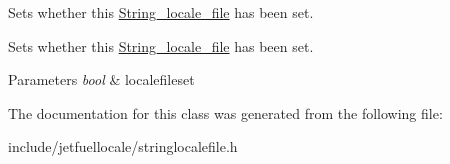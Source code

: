 Sets whether this \hyperlink{classjetfuel_1_1locale_1_1String__locale__file}{String\+\_\+locale\+\_\+file} has been set. 

Sets whether this \hyperlink{classjetfuel_1_1locale_1_1String__locale__file}{String\+\_\+locale\+\_\+file} has been set.


\begin{DoxyParams}{Parameters}
{\em bool} & localefileset \\
\hline
\end{DoxyParams}


The documentation for this class was generated from the following file\+:\begin{DoxyCompactItemize}
\item 
include/jetfuellocale/stringlocalefile.\+h\end{DoxyCompactItemize}
